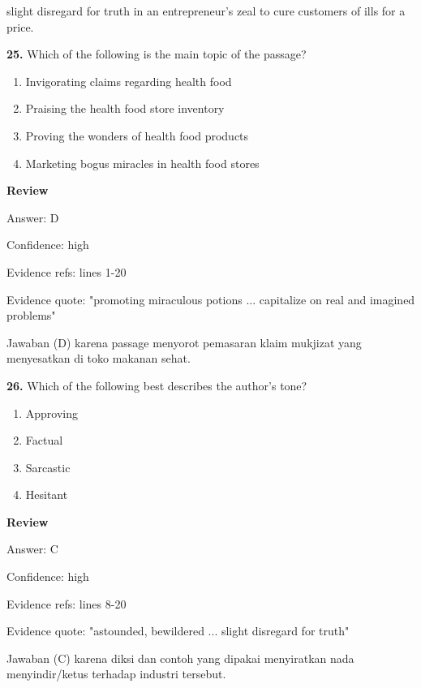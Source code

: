 \documentclass[12pt]{article}
\begin{document}
slight disregard for truth in an entrepreneur's zeal to cure customers of ills for a price.\par
\endgroup
\medskip
\noindent\textbf{25.} Which of the following is the main topic of the passage?
\begin{enumerate}[label=(\Alph*),leftmargin=*,itemsep=0.2em]
\item Invigorating claims regarding health food
\item Praising the health food store inventory
\item Proving the wonders of health food products
\item Marketing bogus miracles in health food stores
\end{enumerate}
\par
\begingroup
\setlength{\parskip}{0pt}
\setlength{\parindent}{0pt}
\textbf{Review}\par
Answer: D\par
Confidence: high\par
Evidence refs: lines 1-20\par
Evidence quote: "promoting miraculous potions ... capitalize on real and imagined problems"\par
Jawaban (D) karena passage menyorot pemasaran klaim mukjizat yang menyesatkan di toko makanan sehat.\par
\endgroup
\par
\vspace{0.25\baselineskip}
\noindent\textbf{26.} Which of the following best describes the author's tone?
\begin{enumerate}[label=(\Alph*),leftmargin=*,itemsep=0.2em]
\item Approving
\item Factual
\item Sarcastic
\item Hesitant
\end{enumerate}
\par
\begingroup
\setlength{\parskip}{0pt}
\setlength{\parindent}{0pt}
\textbf{Review}\par
Answer: C\par
Confidence: high\par
Evidence refs: lines 8-20\par
Evidence quote: "astounded, bewildered ... slight disregard for truth"\par
Jawaban (C) karena diksi dan contoh yang dipakai menyiratkan nada menyindir/ketus terhadap industri tersebut.\par
\endgroup
\end{document}
